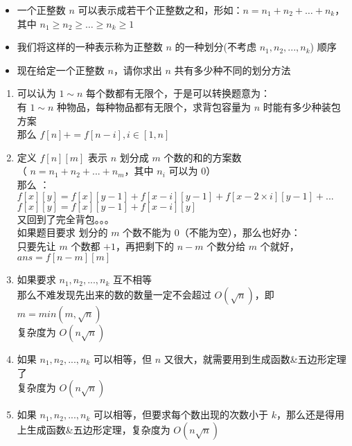 \documentclass[E:/GsjzTle/main/main.tex]{subfiles}
\begin{document}
\begin{itemize}
\item
  一个正整数 \(n\)
  可以表示成若干个正整数之和，形如：\(n=n_1+n_2+…+n_k\)，其中
  \(n_1≥n_2≥…≥n_k≥1\)
\item
  我们将这样的一种表示称为正整数 \(n\) 的一种划分(不考虑
  \(n_1,n_2,...,n_k\)) 顺序
\item
  现在给定一个正整数 \(n\)，请你求出 \(n\) 共有多少种不同的划分方法
\end{itemize}

\begin{enumerate}
\def\labelenumi{\arabic{enumi}.}
\item
  可以认为 \(1 \sim n\) 每个数都有无限个，于是可以转换题意为：\\
  有 \(1\sim n\) 种物品，每种物品都有无限个，求背包容量为 \(n\)
  时能有多少种装包方案\\
  那么 \(f[n] += f[n - i],i∈[1 , n]\)
\item
  定义 \(f[n][m]\) 表示 \(n\) 划分成 \(m\) 个数的和的方案数\\
  （ \(n = n_1+n_2+...+n_m\)，其中 \(n_i\) 可以为 \(0\)）\\
  那么 ：\\
  \(f[x][y] = f[x][y - 1] + f[x - i][y - 1] + f[x - 2\times i][y-1] + ...\)\\
  \(f[x][y] = f[x][y - 1] + f[x - i][y]\) \\
  又回到了完全背包。。。\\
  如果题目要求 划分的 \(m\) 个数不能为 \(0\)（不能为空），那么也好办：\\
  只要先让 \(m\) 个数都 \(+1\)，再把剩下的 \(n-m\) 个数分给 \(m\)
  个就好，\(ans =f[n-m][m]\)
\item
  如果要求 \(n_1,n_2,...,n_k\) 互不相等\\
  那么不难发现先出来的数的数量一定不会超过 \(O(\sqrt{n})\)，即
  \(m = min(m , \sqrt{n})\)\\
  复杂度为 \(O(n\sqrt{n})\)
\item
  如果 \(n_1,n_2,...,n_k\) 可以相等，但 \(n\)
  又很大，就需要用到生成函数\&五边形定理了\\
  复杂度为 \(O(n\sqrt{n})\)
\item
  如果 \(n_1,n_2,...,n_k\) 可以相等，但要求每个数出现的次数小于
  \(k\)，那么还是得用上生成函数\&五边形定理，复杂度为 \(O(n\sqrt{n})\)
\end{enumerate}
\end{document}
